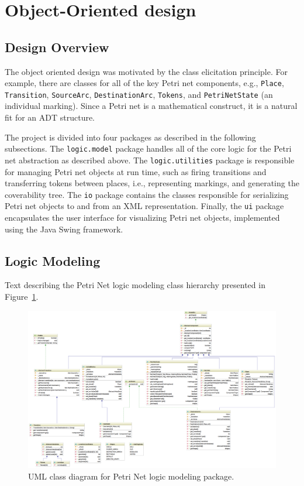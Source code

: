 
\section{Object-Oriented design}

\subsection{Design Overview}
The object oriented design was motivated by the class elicitation principle.
For example, there are classes for all of the key Petri net components, e.g.,
\texttt{Place}, \texttt{Transition}, \texttt{SourceArc}, \texttt{DestinationArc},
\texttt{Tokens}, and \texttt{PetriNetState} (an individual marking). Since a
Petri net is a mathematical construct, it is a natural fit for an ADT structure.

The project is divided into four packages as described in the following subsections.
The \texttt{logic.model} package handles all of the core logic for the Petri net
abstraction as described above. The \texttt{logic.utilities} package is responsible
for managing Petri net objects at run time, such as firing transitions and transferring tokens between places, i.e., representing markings, and generating
the coverability tree. The \texttt{io} package contains the classes responsible
for serializing Petri net objects to and from an XML representation. Finally, the
\texttt{ui} package encapsulates the user interface for visualizing Petri net 
objects, implemented using the Java Swing framework.

\subsection{Logic Modeling}
Text describing the Petri Net logic modeling class hierarchy presented in Figure~\ref{fig:logic-model-uml}.

\begin{figure}
	\centering
	\includegraphics[width=1.0\columnwidth]{figures/logic-model-uml}
	\caption{UML class diagram for Petri Net logic modeling package.\label{fig:logic-model-uml}}
\end{figure}

